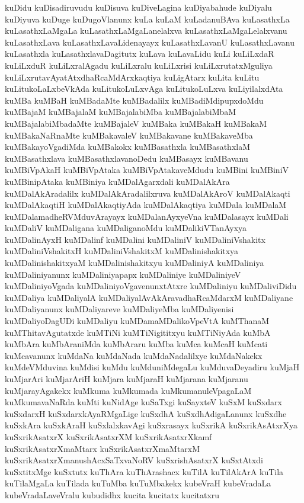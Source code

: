 {kuDidu
kuDisadiruvudu
kuDisuva
kuDiveLagina
kuDiyabahude
kuDiyalu
kuDiyuva
kuDuge
kuDugoVlanunx
kuLa
kuLaM
kuLadanuBAva
kuLasathxLa
kuLasathxLaMgaLa
kuLasathxLaMgaLanelalxva
kuLasathxLaMgaLelalxvanu
kuLasathxLava
kuLasathxLavaLidenayayx
kuLasathxLavanU
kuLasathxLavanu
kuLasathxla
kuLasathxlavaDagitutx
kuLava
kuLavaLidu
kuLi
kuLiLxdaR
kuLiLxduR
kuLiLxralAgadu
kuLiLxralu
kuLiLxrisi
kuLiLxrutatxMguliya
kuLiLxrutavAyatAtxdhaRcaMdArxkaqtiya
kuLigAtarx
kuLita
kuLitu
kuLitukoLaLxbeVkAda
kuLitukoLuLxvAga
kuLitukoLuLxva
kuLiyilalxdAta
kuMBa
kuMBaH
kuMBadaMte
kuMBadalilx
kuMBadiMdipupxdoMdu
kuMBajaM
kuMBajalaM
kuMBajalabiMba
kuMBajalabiMbaM
kuMBajalabiMbadaMte
kuMBajaleV
kuMBaka
kuMBakaH
kuMBakaM
kuMBakaNaRnaMte
kuMBakavaleV
kuMBakavane
kuMBakaveMba
kuMBakayoVgadiMda
kuMBakokx
kuMBasathxla
kuMBasathxlaM
kuMBasathxlava
kuMBasathxlavanoDedu
kuMBasayx
kuMBavanu
kuMBiVpAkaH
kuMBiVpAtaka
kuMBiVpAtakaveMdudu
kuMBini
kuMBiniV
kuMBinipAtaka
kuMBiniya
kuMDalAgarxdali
kuMDalAkAra
kuMDalAkAradalilx
kuMDalAkAradalilxruva
kuMDalAkAroV
kuMDalAkaqti
kuMDalAkaqtiH
kuMDalAkaqtiyAda
kuMDalAkaqtiya
kuMDala
kuMDalaM
kuMDalamadheRVMduvArayayx
kuMDalanAyxyeVna
kuMDalasayx
kuMDali
kuMDaliV
kuMDaligana
kuMDaliganoMdu
kuMDalikiVTanAyxya
kuMDalinAyxH
kuMDalinf
kuMDalini
kuMDaliniV
kuMDaliniVshakitx
kuMDaliniVshakitxH
kuMDaliniVshakitxM
kuMDalinishakitxya
kuMDalinishakitxyaM
kuMDalinishakitxyu
kuMDaliniyA
kuMDaliniya
kuMDaliniyanunx
kuMDaliniyapapx
kuMDaliniye
kuMDaliniyeV
kuMDaliniyoVgada
kuMDaliniyoVgavenunxtAtxre
kuMDaliniyu
kuMDaliviDidu
kuMDaliya
kuMDaliyalA
kuMDaliyalAvAkAravadhaRcaMdarxM
kuMDaliyane
kuMDaliyanunx
kuMDaliyareve
kuMDaliyeMba
kuMDaliyenisi
kuMDaliyoDagUDi
kuMDaliyu
kuMDamaMDalikoVpeVtA
kuMThanaM
kuMThitavAgutatxde
kuMTiNi
kuMTiNigititxyu
kuMTiNiyAda
kuMbA
kuMbAra
kuMbAraniMda
kuMbAraru
kuMba
kuMca
kuMcaH
kuMcati
kuMcavanunx
kuMdaNa
kuMdaNada
kuMdaNadalilxye
kuMdaNakekx
kuMdeVMduvina
kuMdisi
kuMdu
kuMduniMdegaLu
kuMduvaDeyadiru
kuMjaH
kuMjarAri
kuMjarAriH
kuMjara
kuMjaraH
kuMjarana
kuMjaranu
kuMjarayAgakekx
kuMkuma
kuMkumada
kuMkumanuleVpagaLaM
kuMkumavaNaRda
kuMti
kuNidAge
kuSaTxgi
kuSayxteV
kuSxM
kuSxdarx
kuSxdarxH
kuSxdarxkAyaRMgaLige
kuSxdhA
kuSxdhAdigaLanunx
kuSxdhe
kuSxkAra
kuSxkAraH
kuSxlalxkavAgi
kuSxrasayx
kuSxrikA
kuSxrikAsAtxrXya
kuSxrikAsatxrX
kuSxrikAsatxrXM
kuSxrikAsatxrXkamf
kuSxrikAsatxrXmaMtarx
kuSxrikAsatxrXmaMtarxM
kuSxrikAsatxrXmanushAcxSaTxvaNoRV
kuSxrishAsatxrX
kuSxtAtxdi
kuSxtitxMge
kuSxtutx
kuThAra
kuThArashacx
kuTilA
kuTilAkArA
kuTila
kuTilaMgaLa
kuTilada
kuTuMba
kuTuMbakekx
kubeVraH
kubeVradaLa
kubeVradaLaveVralu
kubudidhx
kucita
kucitatx
kucitatxru
}
